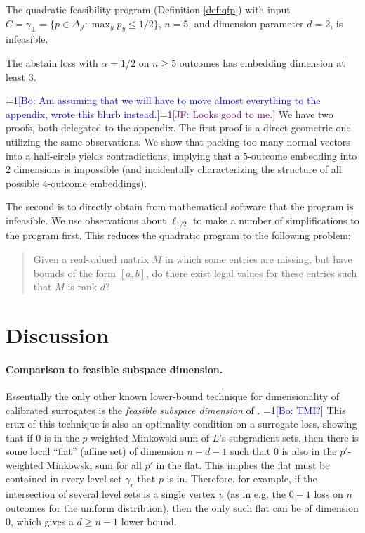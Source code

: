 \documentclass[anon]{colt2020} %
\newcommand{\Comments}{1}
\newcommand{\mynote}[2]{\ifnum\Comments=1\textcolor{#1}{#2}\fi}
\newcommand{\jessie}[1]{\mynote{purple}{[JF: #1]}}
\newcommand{\bo}[1]{\mynote{blue}{[Bo: #1]}}
\newcommand{\simplex}{\Delta_\Y}
\newcommand{\Y}{\mathcal{Y}}
\begin{document}
\begin{proposition}\label{prop:qfp-fails-abstain}
  The quadratic feasibility program (Definition \ref{def:qfp}) with input $C = \gamma_{\bot} = \{p \in \simplex: \max_y p_y \leq 1/2\}$, $n=5$, and dimension parameter $d=2$, is infeasible.
\end{proposition}
\begin{corollary}
  The abstain loss with $\alpha=1/2$ on $n\geq 5$ outcomes has embedding dimension at least $3$.
\end{corollary}

\bo{Am assuming that we will have to move almost everything to the appendix, wrote this blurb instead.}\jessie{Looks good to me.}
We have two proofs, both delegated to the appendix.
The first proof is a direct geometric one utilizing the same observations.
We show that packing too many normal vectors into a half-circle yields contradictions, implying that a $5$-outcome embedding into $2$ dimensions is impossible (and incidentally characterizing the structure of all possible $4$-outcome embeddings).

The second is to directly obtain from mathematical software that the program is infeasible.
We use observations about $\ell_{1/2}$ to make a number of simplifications to the program first.
This reduces the quadratic program to the following problem: 
\begin{quotation}
  Given a real-valued matrix $M$ in which some entries are missing, but have bounds of the form $[a,b]$, do there exist legal values for these entries such that $M$ is rank $d$?
\end{quotation}



\section{Discussion} \label{sec:conclusion}
\paragraph{Comparison to feasible subspace dimension.}
Essentially the only other known lower-bound technique for dimensionality of calibrated surrogates is the \emph{feasible subspace dimension} of \cite{ramaswamy2016convex}.
\bo{TMI?}
This crux of this technique is also an optimality condition on a surrogate loss, showing that if $0$ is in the $p$-weighted Minkowski sum of $L$'s subgradient sets, then there is some local ``flat'' (affine set) of dimension $n-d-1$ such that $0$ is also in the $p'$-weighted Minkowski sum for all $p'$ in the flat.
This implies the flat must be contained in every level set $\gamma_r$ that $p$ is in.
Therefore, for example, if the intersection of several level sets is a single vertex $v$ (as in e.g. the $0-1$ loss on $n$ outcomes for the uniform distribtion), then the only such flat can be of dimension $0$, which gives a $d \geq n-1$ lower bound.
\end{document}
